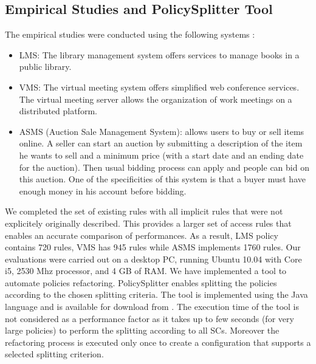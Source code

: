 {\subsection{Empirical Studies and PolicySplitter Tool}
The empirical studies were conducted using the following systems \cite{testcase}:
\begin{itemize}	
\item LMS: The library management system offers services to manage books in a public library.
\item VMS: The virtual meeting system offers simplified web conference services. The virtual meeting server allows the organization of work meetings on 
a distributed platform.
\item ASMS (Auction Sale Management System): allows users to buy or sell items online. A seller can start an auction by submitting a description of the
item he wants to sell and a minimum price (with a start date and an ending date for the auction). Then usual bidding process can apply and people can bid 
on this auction. One of the specificities of this system is that a buyer must have enough money in his account before bidding.
\end{itemize}
We completed the set of existing rules with all implicit rules that were not explicitely originally described. This provides a larger set of access rules that enables
an accurate comparison of performances. As a result, LMS policy contains 720 rules, VMS has 945 rules while ASMS implements 1760 rules. 
Our evaluations were carried out on a desktop PC, running Ubuntu 10.04 with Core i5, 2530 Mhz processor, and 4 GB of RAM. 
We have implemented a tool to automate policies refactoring. PolicySplitter enables splitting the policies according to the chosen splitting criteria. 
The tool is implemented using the Java language and is available for download from \cite{splitter}.
The execution time of the tool is not considered as a performance factor as it takes up to few seconds (for very large policies) to perform the splitting 
according to all SCs. Moreover the refactoring process is executed only once to create a configuration that supports a selected splitting criterion.


}
